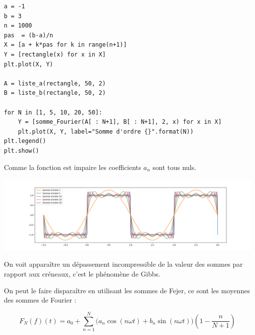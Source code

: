 \begin{Answer}
\begin{lstlisting}
a = -1
b = 3
n = 1000
pas  = (b-a)/n
X = [a + k*pas for k in range(n+1)]
Y = [rectangle(x) for x in X]
plt.plot(X, Y)

A = liste_a(rectangle, 50, 2)
B = liste_b(rectangle, 50, 2)

for N in [1, 5, 10, 20, 50]:
    Y = [somme_Fourier(A[ : N+1], B[ : N+1], 2, x) for x in X]
    plt.plot(X, Y, label="Somme d'ordre {}".format(N))
plt.legend()
plt.show()
\end{lstlisting}
Comme la fonction est impaire les coefficients $a_n$ sont tous nuls.
\begin{center}
\includegraphics[scale=0.4]{TP/Images/TP19_rectangle_Sn.png}
\end{center}
\end{Answer}
On voit apparaître un dépassement incompressible de la valeur des sommes par rapport aux créneaux, c'est le phénomène de Gibbs.

On peut le faire disparaître en utilisant les sommes de Fejer, ce sont les moyennes des sommes de Fourier : 


\[F_N(f)(t) =   a_0 + \sum_{n=1}^{N} \bigl(a_n\cos(n\omega t) + b_n\sin(n\omega t)\bigr)\left(1 - \frac n{N+1}\right)\]

